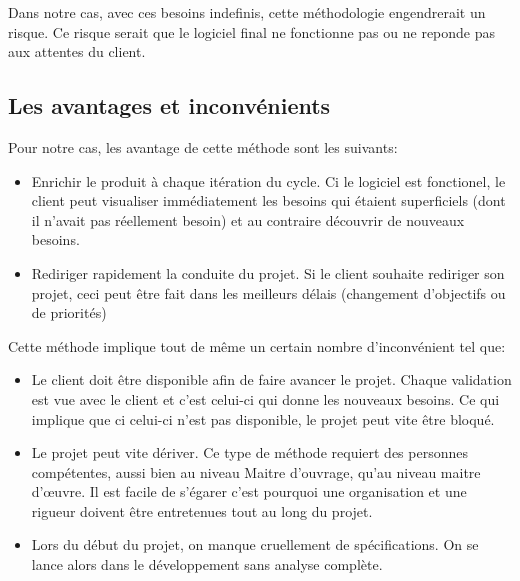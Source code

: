 Dans notre cas, avec ces besoins indefinis, cette méthodologie engendrerait un risque. Ce risque serait que le logiciel final ne fonctionne pas ou ne reponde pas aux attentes du client.

\subsection{Les avantages et inconvénients}
Pour notre cas, les avantage de cette méthode sont les suivants:
\begin{itemize}
    \item Enrichir le produit à chaque itération du cycle. Ci le logiciel est fonctionel, le client peut visualiser immédiatement les besoins qui étaient superficiels (dont il n'avait pas réellement besoin) et au contraire découvrir de nouveaux besoins.
    \item Rediriger rapidement la conduite du projet. Si le client souhaite rediriger son projet, ceci peut être fait dans les meilleurs délais (changement d'objectifs ou de priorités)
\end{itemize}\medskip
 
Cette méthode implique tout de même un certain nombre d'inconvénient tel que:
\begin{itemize}
    \item Le client doit être disponible afin de faire avancer le projet. Chaque validation est vue avec le client et c'est celui-ci qui donne les nouveaux besoins. Ce qui implique que ci celui-ci n'est pas disponible, le projet peut vite être bloqué. 
    \item Le projet peut vite dériver. Ce type de méthode requiert des personnes compétentes, aussi bien au niveau Maitre d'ouvrage, qu'au niveau maitre d'œuvre. Il est facile de s'égarer c'est pourquoi une organisation et une rigueur doivent être entretenues tout au long du projet.
    \item Lors du début du projet, on manque cruellement de spécifications. On se lance alors dans le développement sans analyse complète.    
\end{itemize}\medskip







    
